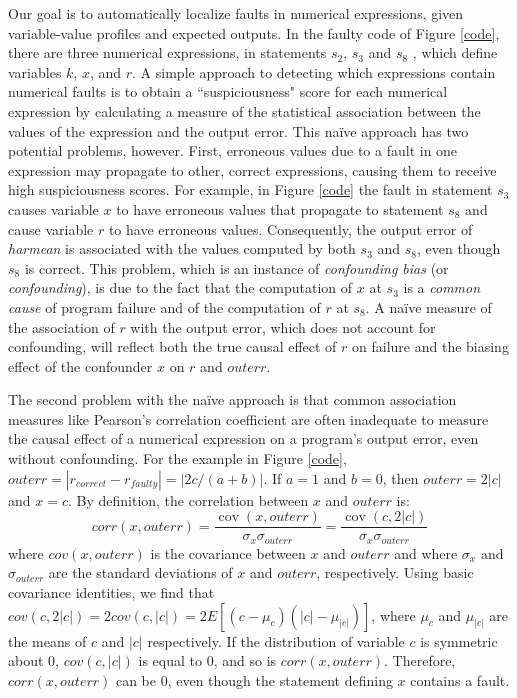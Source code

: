 Our goal is to automatically localize faults in numerical expressions, given variable-value profiles and expected outputs.  In the faulty code of Figure \ref{code}, there are three numerical expressions, in statements $s_2$, $s_3$ and $s_8$ , which define variables $k$, $ x$, and $r$.  A simple approach to detecting which expressions contain numerical faults is to obtain a ``suspiciousness" score for each numerical expression by calculating a measure of the statistical association between the values of the expression and the output error. This na\"{i}ve approach has two potential problems, however.  First, erroneous values due to a fault in one expression may propagate to other, correct expressions, causing them to receive high suspiciousness scores.  For example, in Figure \ref{code} the fault in statement $s_3$ causes variable $x$ to have erroneous values that propagate to statement $s_8$ and cause variable $r$ to have erroneous values. Consequently, the output error of {\it harmean} is associated with the values computed by both $s_3$ and $s_8$, even though $s_8$  is correct.  This problem, which is an instance of {\it confounding bias} (or {\it confounding}), is due to the fact that the computation of $x$ at $s_3$ is a {\it common cause} of program failure and of the computation of $r$ at $s_8$.  A na\"{i}ve measure of the association of $r$ with the output error, which does not account for confounding, will reflect both the true causal effect of $r$ on failure and the biasing effect of the confounder $x$ on $r$ and $outerr$.

The second problem with the na\"{i}ve approach is that common association measures like Pearson's correlation coefficient \cite{Philip2012} are often inadequate to measure the causal effect of a numerical expression on a program's output error, even without confounding.  For the example in Figure \ref{code},  $outerr=|r_{correct}-r_{faulty} |=|2c/(a+b)|$.  If $a=1$ and $b=0$, then $outerr=2|c|$ and $x=c$.  By definition, the correlation between $x$ and $outerr$ is:
\begin{equation*}\label{correlation}
corr(x,outerr) = \frac{{{\mathop{ cov}} (x,outerr)}}{{{\sigma _x}{\sigma _{outerr}}}} = \frac{{{\mathop{ cov}} (c,2|c|)}}{{{\sigma _x}{\sigma _{outerr}}}}
\end{equation*}
where $cov(x,outerr)$ is the covariance between $x$ and $outerr$ and where $\sigma_x$ and $\sigma_{outerr}$ are the standard deviations of $x$ and $outerr$, respectively.  Using basic covariance identities, we find that $cov(c,2|c|)=2cov(c,|c|)=2E[(c-\mu_c )(|c|-\mu_{|c|})]$, where $\mu_c$ and $\mu_{|c|}$ are the means of $c$ and $|c|$ respectively.  If the distribution of variable $c$ is symmetric about 0, $cov(c,|c|)$ is equal to 0, and so is $corr(x,outerr)$. Therefore, $corr(x,outerr)$ can be 0, even though the statement defining $x$ contains a fault.

